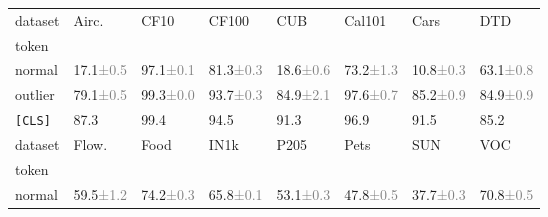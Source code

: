 \begin{table}[h]
    \centering
    
    \begin{tabular}{llllllll}
    \toprule
    dataset &                              Airc. &                               CF10 &                              CF100 &                                CUB &                             Cal101 &                               Cars &                                DTD \\
    token   &                                    &                                    &                                    &                                    &                                    &                                    &                                    \\
    \midrule
    normal  &  17.1\textcolor{gray}{\tiny{±0.5}} &  97.1\textcolor{gray}{\tiny{±0.1}} &  81.3\textcolor{gray}{\tiny{±0.3}} &  18.6\textcolor{gray}{\tiny{±0.6}} &  73.2\textcolor{gray}{\tiny{±1.3}} &  10.8\textcolor{gray}{\tiny{±0.3}} &  63.1\textcolor{gray}{\tiny{±0.8}} \\
    outlier &  79.1\textcolor{gray}{\tiny{±0.5}} &  99.3\textcolor{gray}{\tiny{±0.0}} &  93.7\textcolor{gray}{\tiny{±0.3}} &  84.9\textcolor{gray}{\tiny{±2.1}} &  97.6\textcolor{gray}{\tiny{±0.7}} &  85.2\textcolor{gray}{\tiny{±0.9}} &  84.9\textcolor{gray}{\tiny{±0.9}} \\
    \texttt{[CLS]} &                               87.3 &                               99.4 &                               94.5 &                               91.3 &                               96.9 &                               91.5 &                               85.2 \\
    \bottomrule
    \toprule
    dataset &                              Flow. &                               Food &                               IN1k &                               P205 &                               Pets &                                SUN &                                VOC \\
    token   &                                    &                                    &                                    &                                    &                                    &                                    &                                    \\
    \midrule
    normal  &  59.5\textcolor{gray}{\tiny{±1.2}} &  74.2\textcolor{gray}{\tiny{±0.3}} &  65.8\textcolor{gray}{\tiny{±0.1}} &  53.1\textcolor{gray}{\tiny{±0.3}} &  47.8\textcolor{gray}{\tiny{±0.5}} &  37.7\textcolor{gray}{\tiny{±0.3}} &  70.8\textcolor{gray}{\tiny{±0.5}} \\

\end{tabular}
\end{table}
